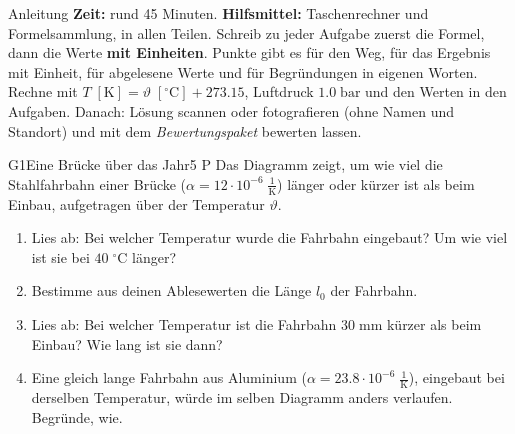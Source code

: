 \documentclass[11pt]{article}
\begin{document}

\begin{lpinfo}{Anleitung}
\textbf{Zeit:} rund 45 Minuten. \textbf{Hilfsmittel:} Taschenrechner und Formelsammlung, in allen Teilen.
Schreib zu jeder Aufgabe zuerst die Formel, dann die Werte \textbf{mit Einheiten}. Punkte gibt es für den Weg,
für das Ergebnis mit Einheit, für abgelesene Werte und für Begründungen in eigenen Worten. Rechne mit
\(T\;[\text{K}] = \vartheta\;[^\circ\text{C}] + 273.15\), Luftdruck \(1.0\;\text{bar}\) und den Werten in den Aufgaben.
Danach: Lösung scannen oder fotografieren (ohne Namen und Standort) und mit dem \emph{Bewertungspaket} bewerten lassen.
\end{lpinfo}


\begin{lpaufgabe}{G1}{Eine Brücke über das Jahr}{5 P}
Das Diagramm zeigt, um wie viel die Stahlfahrbahn einer Brücke (\(\alpha = 12 \cdot 10^{-6}\;\tfrac{1}{\text{K}}\)) länger oder kürzer ist als beim Einbau, aufgetragen über der Temperatur \(\vartheta\).\par\smallskip
\begin{center}\end{center}
\begin{enumerate}[label=\alph*),leftmargin=*,itemsep=2pt,topsep=2pt]
\item Lies ab: Bei welcher Temperatur wurde die Fahrbahn eingebaut? Um wie viel ist sie bei \(40\;^\circ\text{C}\) länger?
\item Bestimme aus deinen Ablesewerten die Länge \(l_0\) der Fahrbahn.
\item Lies ab: Bei welcher Temperatur ist die Fahrbahn \(30\;\text{mm}\) kürzer als beim Einbau? Wie lang ist sie dann?
\item Eine gleich lange Fahrbahn aus Aluminium (\(\alpha = 23.8 \cdot 10^{-6}\;\tfrac{1}{\text{K}}\)), eingebaut bei derselben Temperatur, würde im selben Diagramm anders verlaufen. Begründe, wie.
\end{enumerate}
\end{lpaufgabe}
\end{document}
